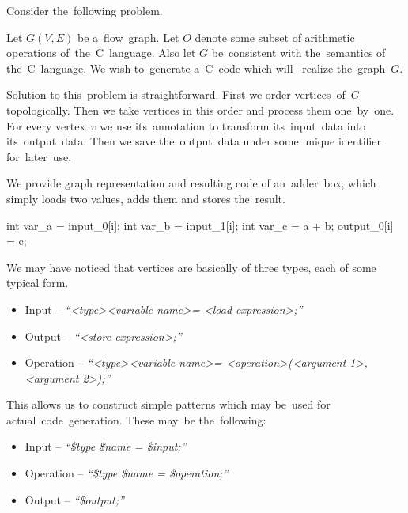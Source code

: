 Consider the~following problem.

\begin{problem}
Let $G(V,E)$ be a~flow~graph. Let $O$ denote some subset of arithmetic operations of~the~C~language. Also let $G$ be~consistent with the~semantics of the~C~language. We wish to~generate a~C~code which will~ realize the~graph~$G$.
\end{problem}

\FloatBarrier

Solution to this~problem is straightforward. First we order vertices~of~$G$ topologically. Then we take vertices in this order and process them one~by~one. For every vertex~$v$ we use its~annotation to transform its~input~data into its~output~data. Then we save the~output~data under some unique identifier for~later~use.

\parspace

We provide graph representation and resulting code of an~adder~box, which simply loads two values, adds them and stores the~result.


\begin{code}
int var_a = input_0[i];
int var_b = input_1[i];
int var_c = a + b;
output_0[i] = c;
\end{code}

\FloatBarrier

We may have noticed that vertices are basically of three types, each of some typical form. 

\begin{itemize}
  \item Input -- \emph{``\textless type\textgreater  \textless variable name\textgreater  = \textless load expression\textgreater ;''}
  \item Output -- \emph{``\textless store expression\textgreater ;''}
  \item Operation -- \emph{``\textless type\textgreater  \textless variable name\textgreater  = \textless operation\textgreater (\textless argument 1\textgreater , \textless argument 2\textgreater );''}
\end{itemize}

This allows us to construct simple patterns which may be~used for actual~code~generation. These may~be the~following:

\begin{itemize}
  \item Input -- \emph{``\$type \$name = \$input;''}
  \item Operation -- \emph{``\$type \$name = \$operation;''}
  \item Output -- \emph{``\$output;''}
\end{itemize}

